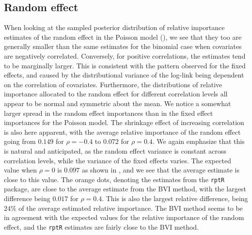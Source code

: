\subsection{Random effect}
When looking at the sampled posterior distribution of relative importance estimates of the random effect in the Poisson model (), we see that they too are generally smaller than the same estimates for the binomial case when covariates are negatively correlated. Conversely, for positive correlations, the estimates tend to be marginally larger. This is consistent with the pattern observed for the fixed effects, and caused by the distributional variance of the log-link being dependent on the correlation of covariates. Furthermore, the distributions of relative importance allocated to the random effect for different correlation levels all appear to be normal and symmetric about the mean. We notice a somewhat larger spread in the random effect importances than in the fixed effect importances for the Poisson model. The shrinkage effect of increasing correlation is also here apparent, with the average relative importance of the random effect going from $0.149$ for $\rho=-0.4$ to $0.072$ for $\rho=0.4$. We again emphasize that this is natural and anticipated, as the random effect variance is constant across correlation levels, while the variance of the fixed effects varies. The expected value when $\rho=0$ is $0.097$ as shown in , and we see that the average estimate is close to this value. The orange dots, denoting the estimates from the \texttt{rptR} package, are close to the average estimate from the BVI method, with the largest difference being $0.017$ for $\rho=0.4$. This is also the largest relative difference, being $24\%$ of the average estimated relative importance. The BVI method seems to be in agreement with the expected values for the relative importance of the random effect, and the \texttt{rptR} estimates are fairly close to the BVI method.
